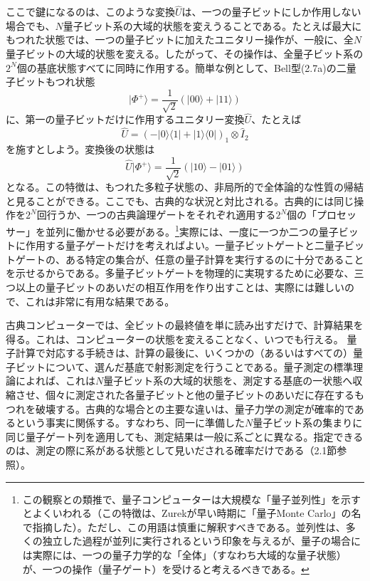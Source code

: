 \hypertarget{srcpage:297}{}\label{srcpage:297}
ここで鍵になるのは、このような変換$\hat U$は、一つの量子ビットにしか作用しない場合でも、$N$量子ビット系の大域的状態を変えうることである。たとえば最大にもつれた状態では、一つの量子ビットに加えたユニタリー操作が、一般に、全$N$量子ビットの大域的状態を変える。したがって、その操作は、全量子ビット系の$2^N$個の基底状態すべてに同時に作用する。簡単な例として、Bell型(2.7a)の二量子ビットもつれ状態
\begin{equation}|\Phi^+\rangle=\frac{1}{\sqrt2}(|00\rangle+|11\rangle)\tag{7.6}\end{equation}
に、第一の量子ビットだけに作用するユニタリー変換$\hat U$、たとえば
\begin{equation}\hat U=(-|0\rangle\langle1|+|1\rangle\langle0|)_1\otimes\hat I_2\tag{7.7}\end{equation}
を施すとしよう。変換後の状態は
\begin{equation}\hat U|\Phi^+\rangle=\frac{1}{\sqrt2}(|10\rangle-|01\rangle)\tag{7.8}\end{equation}
となる。この特徴は、もつれた多粒子状態の、非局所的で全体論的な性質の帰結と見ることができる。ここでも、古典的な状況と対比される。古典的には同じ操作を$2^N$回行うか、一つの古典論理ゲートをそれぞれ適用する$2^N$個の「プロセッサー」を並列に働かせる必要がある。\footnote{この観察との類推で、量子コンピューターは大規模な「量子並列性」を示すとよくいわれる（この特徴は、Zurekが早い時期に「量子Monte Carlo」の名で指摘した\cite{ref330}）。ただし、この用語は慎重に解釈すべきである。並列性は、多くの独立した過程が並列に実行されるという印象を与えるが、量子の場合には実際には、一つの量子力学的な「全体」（すなわち大域的な量子状態）が、一つの操作（量子ゲート）を受けると考えるべきである。}実際には、一度に一つか二つの量子ビットに作用する量子ゲートだけを考えればよい。一量子ビットゲートと二量子ビットゲートの、ある特定の集合が、任意の量子計算を実行するのに十分であることを示せるからである\cite{ref056,ref331,ref332,ref333,ref334}。多量子ビットゲートを物理的に実現するために必要な、三つ以上の量子ビットのあいだの相互作用を作り出すことは、実際には難しいので、これは非常に有用な結果である。

古典コンピューターでは、全ビットの最終値を単に読み出すだけで、計算結果を得る。これは、コンピューターの状態を変えることなく、いつでも行える。
\hypertarget{srcpage:298}{}\label{srcpage:298}
量子計算で対応する手続きは、計算の最後に、いくつかの（あるいはすべての）量子ビットについて、選んだ基底で射影測定を行うことである。量子測定の標準理論によれば、これは$N$量子ビット系の大域的状態を、測定する基底の一状態へ収縮させ、個々に測定された各量子ビットと他の量子ビットのあいだに存在するもつれを破壊する。古典的な場合との主要な違いは、量子力学の測定が確率的であるという事実に関係する。すなわち、同一に準備した$N$量子ビット系の集まりに同じ量子ゲート列を適用しても、測定結果は一般に系ごとに異なる。指定できるのは、測定の際に系がある状態として見いだされる確率だけである（2.1節参照）。

